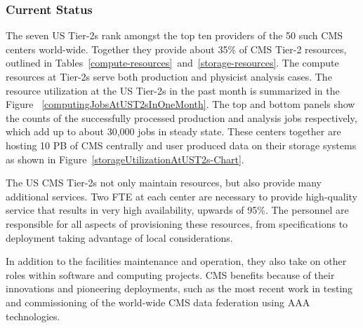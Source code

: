 \documentclass[11pt,a4paper]{article}
\begin{document}
\subsubsection{Current Status}

The seven US Tier-2s rank amongst the top ten providers of the 50 such 
CMS centers world-wide. Together they provide about 35\% of CMS
Tier-2 resources, outlined in Tables~\ref{compute-resources}~and~\ref{storage-resources}.  
The compute resources at Tier-2s serve both production and physicist analysis cases.  The resource utilization
at the US Tier-2s in the past month is summarized in the Figure~
\ref{computingJobsAtUST2sInOneMonth}. The top and bottom panels
show the counts of the successfully processed production and analysis 
jobs respectively, which add up to about 30,000 jobs in steady state.
These centers together are hosting 10 PB of CMS centrally and
user produced data on their storage systems as shown in 
Figure~\ref{storageUtilizationAtUST2s-Chart}.

The US CMS Tier-2s not only maintain resources, but
also provide many additional services.  Two FTE at each center
are necessary to provide high-quality service that results in 
very high availability, upwards of 95\%. The personnel are responsible
for all aspects of provisioning these resources, from specifications to
deployment taking advantage of local considerations. 

In addition to the facilities maintenance and operation, they also take 
on other roles within software and computing projects.  CMS benefits
because of their innovations and pioneering deployments, such as
the most recent work in testing and commissioning of the world-wide
CMS data federation using AAA technologies.
\end{document}
